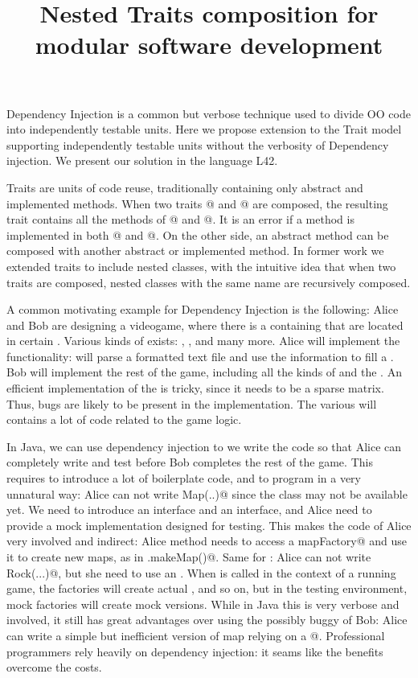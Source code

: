 \documentclass[a4paper,twoside,british,9pt]{extarticle}
\begin{document}
\title{Nested Traits composition for modular software development}
\date{}
\maketitle
\vspace{-10ex}
Dependency Injection is a common but verbose technique
used to divide OO code into independently testable units.
Here we propose extension to the Trait model
supporting independently testable units without
the verbosity of Dependency injection.
We present our solution in the language L42.

Traits are units of code reuse, traditionally containing
only abstract and implemented methods.
When two traits @ and @ are composed, the resulting trait contains
all the methods of @ and @.
It is an error if a method \Q@m@ is implemented in both @ and @.
On the other side, an abstract method can be composed with
another abstract or implemented method.
In former work we extended traits to include nested classes, with the intuitive
idea that when two traits are composed, nested classes with the same name are recursively composed.


A common motivating example for Dependency Injection is the following:
Alice and Bob are designing a videogame, where there
is a \Q@Map@ containing \Q@Item@s that are located in certain
\Q@Point@s.
Various kinds of \Q@Item@s exists: \Q@Wall@s, \Q@Rock@s,
\Q@Tree@s and many more. Alice will implement the \Q@load@ functionality:
\Q@load@ will parse a formatted text file
and use the information to fill a \Q@Map@.
Bob will implement the rest of the game, 
including all the kinds of \Q@Item@s and
the \Q@Map@.
An efficient implementation of the \Q@Map@ is tricky,
since it needs to be a sparse matrix.
Thus, bugs are likely to be present in the \Q@Map@ implementation.
The various \Q@Item@s will contains a lot of code related to the game logic.

In Java, we can use dependency injection to we write the code so that Alice can 
completely write and test \Q@load@ before
Bob completes the rest of the game.
This requires to introduce a lot of boilerplate code, and 
to program in a very unnatural way:
Alice can not write \Q@new Map(..)@
since the \Q@Map@ class may not be available yet.
We need to introduce an \Q@IMap@ interface and an \Q@IMapFactory@ interface,
and Alice need to provide
a mock implementation designed for testing.
This makes the code of Alice very involved and indirect:
Alice \Q@load@ method needs to access a \Q@IMapFactory mapFactory@
and use it to create new maps, as in \Q@mapFactory.makeMap()@.
Same for \Q@Item@s: Alice can not write \Q@new Rock(...)@,
but she need to use an \Q@IItemFactory@.
When \Q@load@ is called in the context of a running game,
the factories will create actual \Q@Map@s, \Q@Rock@s
and so on, but in the testing environment, 
mock factories will create mock versions.
While in Java this is very verbose and involved,
it still has great advantages over using the
possibly buggy \Q@Map@ of Bob: Alice can 
write a simple but inefficient version of map relying
on a @.
Professional programmers rely heavily on dependency
injection: it seams like the benefits overcome the costs.
\end{document}
